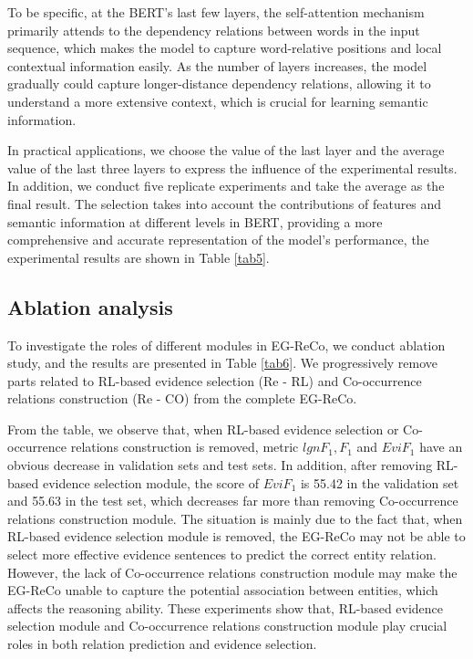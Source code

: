\documentclass[preprint,12pt]{elsarticle}
\begin{document}
To be specific, at the BERT's last few layers, the self-attention mechanism primarily attends to the dependency relations between words in the input sequence, which makes the model to capture word-relative positions and local contextual information easily. As the number of layers increases, the model gradually could capture longer-distance dependency relations, allowing it to understand a more extensive context, which is crucial for learning semantic information.

In practical applications, we choose the value of the last layer and the average value of the last three layers to express the influence of the experimental results. In addition, we conduct five replicate experiments and take the average as the final result. The selection takes into account the contributions of features and semantic information at different levels in BERT, providing a more comprehensive and accurate representation of the model’s performance, the experimental results are shown in Table \ref{tab5}.



\subsection{Ablation analysis}\label{subsec4}
To investigate the roles of different modules in EG-ReCo, we conduct ablation study, and the results are presented in Table \ref{tab6}. We progressively remove parts related to RL-based evidence selection (Re -   RL) and Co-occurrence relations construction (Re - CO) from the complete EG-ReCo.

From the table, we observe that, when RL-based evidence selection or  Co-occurrence relations construction is removed, metric $lgn F_1,F_1$  and $Evi F_1$ have an obvious decrease in validation sets and test sets.  In addition, after removing RL-based evidence selection module, the score of $Evi F_1$  is 55.42 in the validation set and 55.63 in the test set, which decreases far more than removing Co-occurrence relations construction module. The situation is mainly due to the fact that, when RL-based evidence selection module is removed, the EG-ReCo may not be able to select more effective evidence sentences to predict the correct entity relation. However, the lack of Co-occurrence relations construction module may make the EG-ReCo unable to capture the potential association between entities, which affects the reasoning ability. These experiments show that, RL-based evidence selection module and Co-occurrence relations construction module play crucial roles in both relation prediction and evidence selection.
\end{document}
